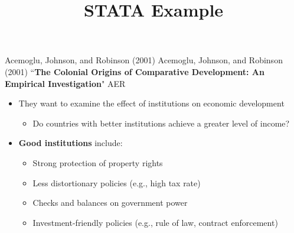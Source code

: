 \documentclass[dvipsnames,hyperref={pdfpagelabels=false}]{beamer}
\begin{document}
\title[]  
{STATA Example}


\author 
{}

\institute{}






\date
{}


\begin{frame}{}
	\titlepage
\end{frame}



\begin{frame}{Acemoglu, Johnson, and Robinson (2001)}
	Acemoglu, Johnson, and Robinson (2001) ``\textbf{The Colonial Origins of Comparative Development: An Empirical Investigation}" AER
	\begin{itemize}
		\vspace{0.2cm}
		\item They want to examine the effect of institutions on  economic development
		\vspace{0.2cm}
			\begin{itemize}
		\item Do countries with better institutions achieve a greater level of income?
					\end{itemize}

			\vspace{0.2cm}
			\item \textbf{Good institutions} include:
			\begin{itemize}
				\vspace{0.2cm}
				\item Strong protection of property rights
				\item Less distortionary policies (e.g., high tax rate)
				\item Checks and balances on government power
				\item Investment-friendly policies (e.g., rule of law, contract enforcement)
			\end{itemize}
			
			
			
			
			
			

		
		
	\end{itemize}
\end{frame}
\end{document}
